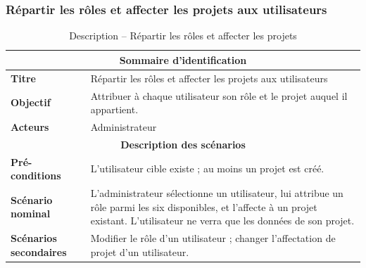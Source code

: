 \subsubsection{Répartir les rôles et affecter les projets aux utilisateurs}
\begin{table}[H]
\centering
\renewcommand{\arraystretch}{1.3}
\begin{tabular}{@{}p{}p{}@{}}
\hline
\multicolumn{2}{c}{\textbf{Sommaire d'identification}} \\
\hline
\textbf{Titre} & Répartir les rôles et affecter les projets aux utilisateurs \\
\textbf{Objectif} & Attribuer à chaque utilisateur son rôle et le projet auquel il appartient. \\
\textbf{Acteurs} & Administrateur \\
\hline
\multicolumn{2}{c}{\textbf{Description des scénarios}} \\
\hline
\textbf{Pré-conditions} & L'utilisateur cible existe ; au moins un projet est créé. \\
\textbf{Scénario nominal} & L'administrateur sélectionne un utilisateur, lui attribue un rôle parmi les six disponibles, et l'affecte à un projet existant. L'utilisateur ne verra que les données de son projet. \\
\textbf{Scénarios secondaires} & Modifier le rôle d'un utilisateur ; changer l'affectation de projet d'un utilisateur. \\
\hline
\end{tabular}
\caption{Description -- Répartir les rôles et affecter les projets}
\end{table}

